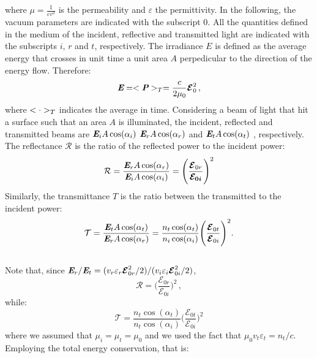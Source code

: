 where $\mu = \frac{1}{\varepsilon v^2}$ is the permeability and $\varepsilon$ the permittivity. In the following, the vacuum parameters are indicated with the subscript $0$. All the quantities defined in the medium of the incident, reflective and transmitted light are indicated with the subscripts $i$, $r$ and $t$, respectively.
The irradiance $E$ is defined as the average energy that crosses in unit time a unit area $A$ perpedicular to the direction of the energy flow.
Therefore:
\begin{equation}
\textit{\textbf{E}} = <\textit{\textbf{P}}>_{T} = \frac{c}{2\mu_0}\boldsymbol{\mathcal{E}}_0^2\,,
\end{equation}
where $<\cdot>_T$ indicates the average in time.
Considering a beam of light that hit a surface such that an area $A$ is illuminated, the incident, reflected and transmitted beams are $\textit{\textbf{E}}_i A\cos(\alpha_i)$ $\textit{\textbf{E}}_r A\cos(\alpha_r)$ and $\textit{\textbf{E}}_t A\cos(\alpha_t)$ , respectively.
The reflectance $\mathcal{R}$ is the ratio of the reflected power to the incident power:
\begin{equation}\label{reflectance}
\mathcal{R} = \frac{\textit{\textbf{E}}_r A\cos(\alpha_r)}{\textit{\textbf{E}}_i A\cos(\alpha_i)} =\Bigg(\frac{\boldsymbol{\mathcal{E}}_{0r}}{\boldsymbol{\mathcal{E}_{0i}}}\Bigg)^2
\end{equation}
Similarly, the transmittance $T$ is the ratio between the transmitted to the incident power:
\begin{equation}\label{transmittance}
\mathcal{T} = \frac{\textit{\textbf{E}}_tA\cos(\alpha_t)}{\textit{\textbf{E}}_r A\cos(\alpha_r)}= \frac{n_t \cos(\alpha_t)}{n_i\cos(\alpha_i)}\Bigg(\frac{\boldsymbol{\mathcal{E}}_{0 t}}{\boldsymbol{\mathcal{E}}_{0 i}}\Bigg)^2.
\end{equation}\\
Note that, since  $\textit{\textbf{E}} _r/\textit{\textbf{E}}_t = (v_r\varepsilon_r \boldsymbol{\mathcal{E}}_{0r}^2/2)/(v_i\varepsilon_i \boldsymbol{\mathcal{E}}_{0i}^2/2)$,
\begin{equation}\label{R}
\mathcal{R} = \Big(\frac{\boldsymbol{\mathcal{E}}_{0 r}}{\boldsymbol{\mathcal{E}}_{0 i}}\Big)^2\,,
\end{equation} 
while: \begin{equation}\label{T}
\mathcal{T} = \frac{n_t \cos(\alpha_t)}{n_t \cos(\alpha_i)}\Bigg(\frac{\boldsymbol{\mathcal{E}}_{0 t}}{\boldsymbol{\mathcal{E}}_{0 i}}\Bigg)^2
\end{equation}
where we assumed that $\mu_i = \mu_t  = \mu_0$ and we used the fact that $\mu_0 v_t\varepsilon_t=n_t/c$.
Employing the total energy conservation, that is:
